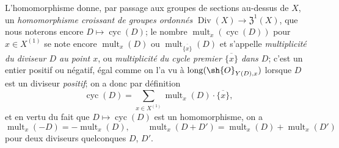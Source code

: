 \begin{env}[21.6.7]
\label{IV.21.6.7}
L'homomorphisme  donne, par passage aux groupes de sections au-dessus de $X$, un \emph{homomorphisme croissant de groupes ordonnés} $\operatorname{Div}(X)\to\mathfrak{Z}^1(X)$, que nous noterons encore $D\mapsto\operatorname{cyc}(D)$;
le nombre $\operatorname{mult}_x(\operatorname{cyc}(D))$ pour $x\in X^{(1)}$ se note encore $\operatorname{mult}_x(D)$ ou $\operatorname{mult}_{\overline{\{x\}}}(D)$ et s'appelle \emph{multiplicité du diviseur $D$ au point $x$}, ou \emph{multiplicité du cycle premier $\overline{\{x\}}$ dans $D$};
c'est un entier positif ou négatif, égal comme on l'a vu à $\operatorname{long}(\sh{O}_{Y(D),x})$ lorsque $D$ est un diviseur \emph{positif};
on a donc par définition
\[
\label{IV.21.6.7.1}
  \operatorname{cyc}(D)=\sum_{x\in X^{(1)}}\operatorname{mult}_x(D)\cdot\overline{\{x\}},
  \tag{21.6.7.1}
\]
et en vertu du fait que $D\mapsto\operatorname{cyc}(D)$ est un homomorphisme, on a
\[
\label{IV.21.6.7.2}
  \operatorname{mult}_x(-D)=-\operatorname{mult}_x(D),\qquad
  \operatorname{mult}_x(D+D')=\operatorname{mult}_x(D)+\operatorname{mult}_x(D')
  \tag{21.6.7.2}
\]
pour deux diviseurs quelconques $D$, $D'$.


\end{env}
